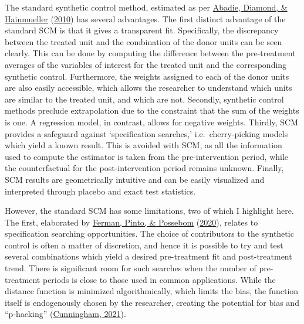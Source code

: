 \documentclass[12pt,nobind, a4paper]{reedthesis}
\begin{document}
 The standard synthetic control method, estimated as per \protect\hyperlink{ref-abadie_synthetic_2010}{Abadie, Diamond, \& Hainmueller} (\protect\hyperlink{ref-abadie_synthetic_2010}{2010}) has several advantages. The first distinct advantage of the standard SCM is that it gives a transparent fit. Specifically, the discrepancy between the treated unit and the combination of the donor units can be seen clearly. This can be done by computing the difference between the pre-treatment averages of the variables of interest for the treated unit and the corresponding synthetic control. Furthermore, the weights assigned to each of the donor units are also easily accessible, which allows the researcher to understand which units are similar to the treated unit, and which are not. Secondly, synthetic control methods preclude extrapolation due to the constraint that the sum of the weights is one. A regression model, in contrast, allows for negative weights. Thirdly, SCM provides a safeguard against `specification searches,' i.e.~cherry-picking models which yield a known result. This is avoided with SCM, as all the information used to compute the estimator is taken from the pre-intervention period, while the counterfactual for the post-intervention period remains unknown. Finally, SCM results are geometrically intuitive and can be easily visualized and interpreted through placebo and exact test statistics.
 \linebreak

 However, the standard SCM has some limitations, two of which I highlight here. The first, elaborated by \protect\hyperlink{ref-ferman_cherry_2020}{Ferman, Pinto, \& Possebom} (\protect\hyperlink{ref-ferman_cherry_2020}{2020}), relates to specification searching opportunities. The choice of contributors to the synthetic control is often a matter of discretion, and hence it is possible to try and test several combinations which yield a desired pre-treatment fit and post-treatment trend. There is significant room for such searches when the number of pre-treatment periods is close to those used in common applications. While the distance function is minimized algorithmically, which limits the bias, the function itself is endogenously chosen by the researcher, creating the potential for bias and ``p-hacking'' (\protect\hyperlink{ref-cunningham_causal_2021}{Cunningham, 2021}).
 \linebreak
\end{document}
